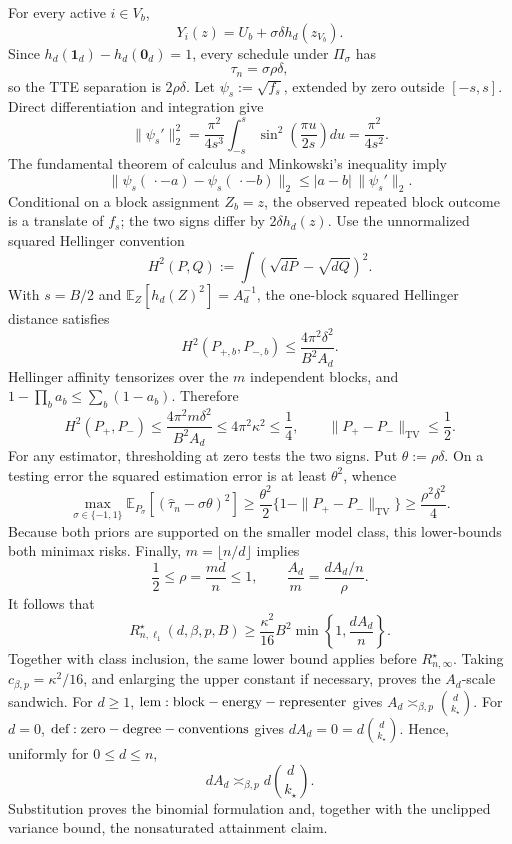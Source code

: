 For every active \(i\in V_b\),
\[
Y_i(z)=U_b+\sigma\delta h_d(z_{V_b}).
\]
Since \(h_d(\mathbf1_d)-h_d(\mathbf0_d)=1\), every schedule under \(\Pi_\sigma\) has
\[
\tau_n=\sigma\rho\delta,
\]
so the TTE separation is \(2\rho\delta\). Let \(\psi_s:=\sqrt{f_s}\), extended by zero outside \([-s,s]\). Direct differentiation and integration give
\[
\|\psi_s'\|_2^2
=\frac{\pi^2}{4s^3}\int_{-s}^{s}
\sin^2\!\left(\frac{\pi u}{2s}\right)du
=\frac{\pi^2}{4s^2}.
\]
The fundamental theorem of calculus and Minkowski's inequality imply
\[
\|\psi_s(\,\cdot-a)-\psi_s(\,\cdot-b)\|_2
\le|a-b|\,\|\psi_s'\|_2.
\]
Conditional on a block assignment \(Z_b=z\), the observed repeated block outcome is a translate of \(f_s\); the two signs differ by \(2\delta h_d(z)\). Use the unnormalized squared Hellinger convention
\[
H^2(P,Q):=\int(\sqrt{dP}-\sqrt{dQ})^2.
\]
With \(s=B/2\) and \(\mathbb E_Z[h_d(Z)^2]=A_d^{-1}\), the one-block squared Hellinger distance satisfies
\[
H^2(P_{+,b},P_{-,b})
\le\frac{4\pi^2\delta^2}{B^2A_d}.
\]
Hellinger affinity tensorizes over the \(m\) independent blocks, and \(1-\prod_b a_b\le\sum_b(1-a_b)\). Therefore
\[
H^2(P_+,P_-)
\le\frac{4\pi^2m\delta^2}{B^2A_d}
\le4\pi^2\kappa^2
\le\frac14,
\qquad
\|P_+-P_-\|_{\mathrm{TV}}\le\frac12.
\]
For any estimator, thresholding at zero tests the two signs. Put \(\theta:=\rho\delta\). On a testing error the squared estimation error is at least \(\theta^2\), whence
\[
\max_{\sigma\in\{-1,1\}}
\mathbb E_{P_\sigma}[(\widehat\tau_n-\sigma\theta)^2]
\ge\frac{\theta^2}{2}
\{1-\|P_+-P_-\|_{\mathrm{TV}}\}
\ge\frac{\rho^2\delta^2}{4}.
\]
Because both priors are supported on the smaller model class, this lower-bounds both minimax risks. Finally, \(m=\lfloor n/d\rfloor\) implies
\[
\frac12\le\rho=\frac{md}{n}\le1,
\qquad
\frac{A_d}{m}=\frac{dA_d/n}{\rho}.
\]
It follows that
\[
R_{n,\ell_1}^\star(d,\beta,p,B)
\ge\frac{\kappa^2}{16}B^2
\min\!\left\{1,\frac{dA_d}{n}\right\}.
\]
Together with class inclusion, the same lower bound applies before \(R_{n,\infty}^\star\). Taking \(c_{\beta,p}=\kappa^2/16\), and enlarging the upper constant if necessary, proves the \(A_d\)-scale sandwich. For \(d\ge1\), \({\rm lem:block-energy-representer}\) gives \(A_d\asymp_{\beta,p}\binom d{k_\star}\). For \(d=0\), \({\rm def:zero-degree-conventions}\) gives \(dA_d=0=d\binom d{k_\star}\). Hence, uniformly for \(0\le d\le n\),
\[
dA_d\asymp_{\beta,p}d\binom d{k_\star}.
\]
Substitution proves the binomial formulation and, together with the unclipped variance bound, the nonsaturated attainment claim.